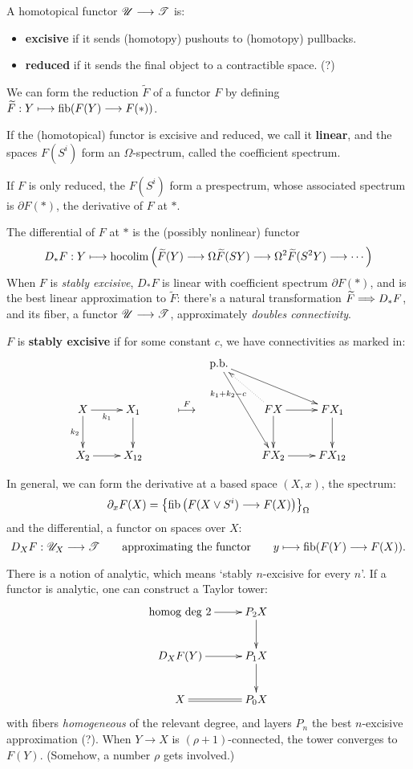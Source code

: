 \documentclass[11pt]{article}
\begin{document}
\begin{Calculus I}
\begin{itemise}
\setlength{\parindent}{.25in}
\item A homotopical functor $\mathscr{U}\longrightarrow\mathscr{T}$ is:
\begin{itemize}\squishlist
\setlength{\parindent}{.25in}
\item  \textbf{excisive} if it sends (homotopy) pushouts to (homotopy) pullbacks.
\item \textbf{reduced} if it sends the final object to a contractible space. (?)
\end{itemize}
\item We can  form the reduction $\widetilde{F}$ of a functor $F$ by defining $\widetilde{F}:Y\longmapsto\operatorname{fib}(F(Y)\longrightarrow F(*))$.
\item If the (homotopical) functor is excisive and reduced, we call it \textbf{linear}, and the spaces $F(S^i)$ form an $\Omega$-spectrum, called the coefficient spectrum.
\item If $F$ is only reduced, the $F(S^i)$ form a prespectrum, whose associated spectrum is $\partial F(*)$, the derivative of $F$ at $*$.
\item The differential of $F$ at $*$ is the (possibly nonlinear) functor
\[D_*F:Y\longmapsto\operatorname*{hocolim}\left(\widetilde{F}(Y)\longrightarrow\Omega\widetilde{F}(SY)\longrightarrow\Omega^2\widetilde{F}(S^2Y)\longrightarrow\cdots \right)\]
When $F$ is \emph{stably excisive}, $D_*F$ is linear with coefficient spectrum $\partial F(*)$, and is the best linear approximation to $\widetilde{F}$: there's a natural transformation $\widetilde{F}\Longrightarrow D_*F$, and its fiber, a functor $\mathscr{U}\longrightarrow\mathscr{T}$, approximately \emph{doubles connectivity}.

$F$ is \textbf{stably excisive} if for some constant $c$, we have connectivities as marked in:
\[\xymatrix{
&%
&%
&%
\textup{p.b.}
\ar[rrd]
\ar[rdd]
&%
&%
\\%
X\ar[r]_-{k_1}
\ar[d]_-{k_2}
&%
X_1
\ar[d]
&%
\makebox[0cm][l]{\,$\overset{F}{\mapsto}$}&%
&
FX
\ar@{..>}[ul]^-{k_1+k_2-c}
\ar[r]
\ar[d]
&%
FX_1
\ar[d]
\\%
X_2\ar[r]
&%
X_{12}
&%
&&%
FX_{2}
\ar[r]
&%
FX_{12}
}\]

\item In general, we can form the derivative at a based space $(X,x)$, the spectrum:
\[\partial_xF(X)= \left\{\operatorname{fib}\left(F(X\vee S^i)\longrightarrow F(X)\right)\right\}_\Omega\]
and the differential, a functor on spaces over $X$:
\[D_XF:\mathscr{U}_X\longrightarrow\mathscr{T}\textup{\qquad approximating the functor\qquad }y\longmapsto\operatorname{fib}(F(Y)\longrightarrow F(X)).\]
\item There is a notion of analytic, which means `stably $n$-excisive for every $n$'. If a functor is analytic, one can construct a Taylor tower:
\[\xymatrix{
\textup{homog deg 2}\ar[r]&\ar[d]P_2X\\
D_XF(Y)\ar[r]&\ar[d]P_1X\\
X\ar@{=}[r]
&P_0X
}
\]
with fibers \emph{homogeneous} of the relevant degree, and layers $P_n$ the best $n$-excisive approximation (?). When $Y\to X$ is $(\rho+1)$-connected, the tower converges to $F(Y)$. (Somehow, a number $\rho$ gets involved.)
\end{itemise}

\end{Calculus I}
\end{document}
